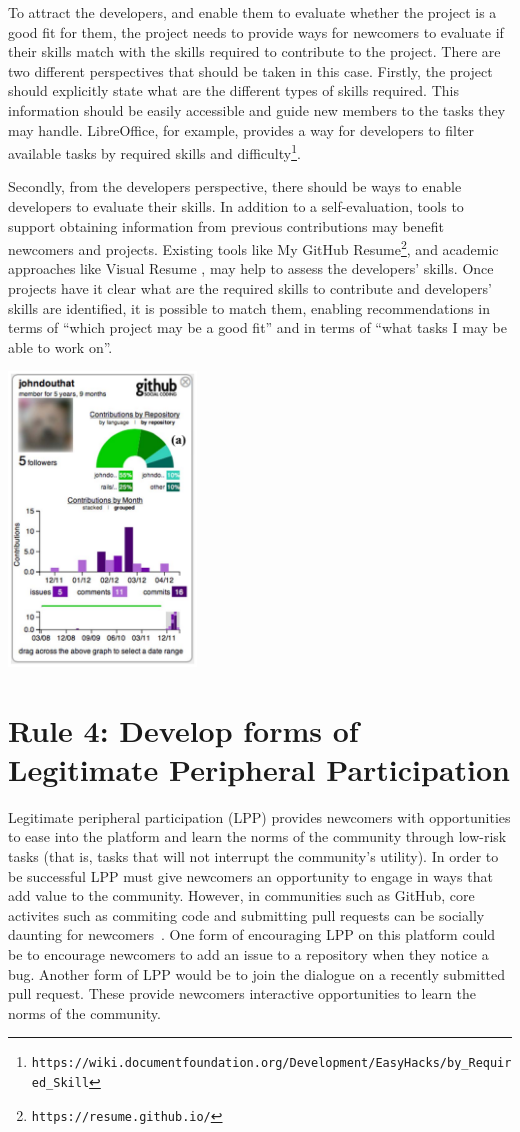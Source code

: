 \documentclass[10pt,letterpaper]{article}
\newcommand{\rulemajor}[1]{\section{#1}}
\newcommand{\withurl}[2]{{#1}\footnote{{\texttt{#2}}}}
\begin{document}
To attract the developers,
and enable them to evaluate whether the project is a good fit for them,
the project needs to provide ways for newcomers to evaluate if their skills match with the skills required to contribute to the project.
There are two different perspectives that should be taken in this case.
Firstly,
the project should explicitly state what are the different types of skills required.
This information should be easily accessible and guide new members to the tasks they may handle.
LibreOffice,
for example,
provides a way for developers to filter available tasks by
\withurl{required skills and difficulty}{https://wiki.documentfoundation.org/Development/EasyHacks/by\_Required\_Skill}.

Secondly,
from the developers perspective,
there should be ways to enable developers to evaluate their skills.
In addition to a self-evaluation,
tools to support obtaining information from previous contributions may benefit newcomers and projects.
Existing tools like \withurl{My GitHub Resume}{https://resume.github.io/},
and academic approaches like Visual Resume \cite{sarma2016},
may help to assess the developers' skills.
Once projects have it clear what are the required skills to contribute and developers' skills are identified,
it is possible to match them,
enabling recommendations in terms of ``which project may be a good fit''
and in terms of ``what tasks I may be able to work on''.

\includegraphics[width=5.0cm]{contributions.png}

\rulemajor{Rule 4: Develop forms of Legitimate Peripheral Participation}

Legitimate peripheral participation (LPP) provides newcomers with opportunities to ease into the platform and learn the norms of the community through low-risk tasks
(that is, tasks that will not interrupt the community’s utility).
In order to be successful LPP must give newcomers an opportunity to engage in ways that add value to the community.
However,
in communities such as GitHub,
core activites such as commiting code and submitting pull requests can be socially daunting for newcomers~\cite{steinmacher2015}.
One form of encouraging LPP on this platform could be to encourage newcomers to add an issue to a repository when they notice a bug.
Another form of LPP would be to join the dialogue on a recently submitted pull request.
These provide newcomers interactive opportunities to learn the norms of the community. 
\end{document}
